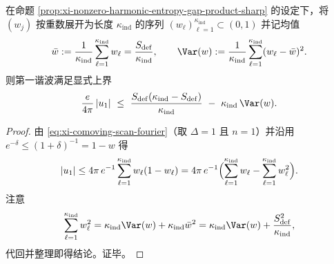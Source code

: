\begin{proposition}[第一谐波的方差惩罚律]\label{prop:xi-first-harmonic-variance-penalty}
在命题 \ref{prop:xi-nonzero-harmonic-entropy-gap-product-sharp} 的设定下，将 \((w_j)\) 按重数展开为长度 \(\kappa_{\mathrm{ind}}\) 的序列 \((w_\ell)_{\ell=1}^{\kappa_{\mathrm{ind}}}\subset(0,1)\) 并记均值
\[
\bar w:=\frac{1}{\kappa_{\mathrm{ind}}}\sum_{\ell=1}^{\kappa_{\mathrm{ind}}}w_\ell=\frac{S_{\mathrm{def}}}{\kappa_{\mathrm{ind}}},
\qquad
\Var(w):=\frac{1}{\kappa_{\mathrm{ind}}}\sum_{\ell=1}^{\kappa_{\mathrm{ind}}}(w_\ell-\bar w)^2.
\]
则第一谐波满足显式上界
\[
\frac{e}{4\pi}\,|u_1|
\ \le\
\frac{S_{\mathrm{def}}(\kappa_{\mathrm{ind}}-S_{\mathrm{def}})}{\kappa_{\mathrm{ind}}}
\ -\
\kappa_{\mathrm{ind}}\,\Var(w).
\]
\end{proposition}
\begin{proof}
由 \eqref{eq:xi-comoving-scan-fourier}（取 \(\Delta=1\) 且 \(n=1\)）并沿用 \(e^{-\delta}\le (1+\delta)^{-1}=1-w\) 得
\[
|u_1|
\le
4\pi\,e^{-1}\sum_{\ell=1}^{\kappa_{\mathrm{ind}}}w_\ell(1-w_\ell)
=
4\pi\,e^{-1}\Bigl(\sum_{\ell=1}^{\kappa_{\mathrm{ind}}}w_\ell-\sum_{\ell=1}^{\kappa_{\mathrm{ind}}}w_\ell^2\Bigr).
\]
注意
\[
\sum_{\ell=1}^{\kappa_{\mathrm{ind}}}w_\ell^2
=
\kappa_{\mathrm{ind}}\Var(w)+\kappa_{\mathrm{ind}}\bar w^2
=
\kappa_{\mathrm{ind}}\Var(w)+\frac{S_{\mathrm{def}}^2}{\kappa_{\mathrm{ind}}},
\]
代回并整理即得结论。证毕。
\end{proof}

